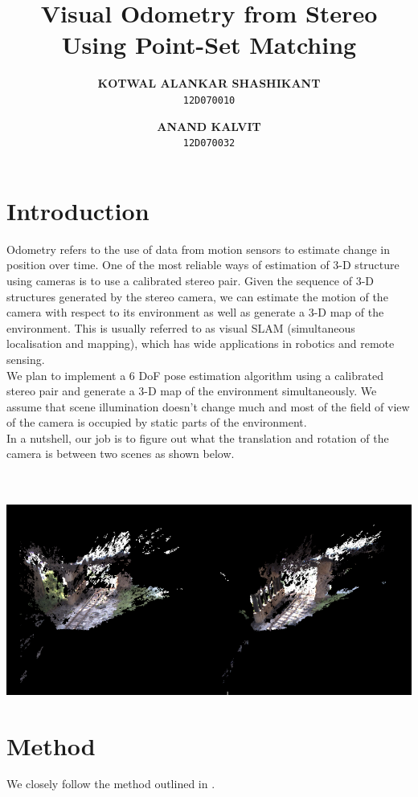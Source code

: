 \documentclass[11pt, a4paper]{article}
\author{
  \textbf{KOTWAL ALANKAR SHASHIKANT}\\
  \texttt{12D070010}
  \and
  \textbf{ANAND KALVIT}\\
  \texttt{12D070032}
}
\title{Visual Odometry from Stereo Using Point-Set Matching}
\begin{document}
\maketitle
\newpage

\section{Introduction}
Odometry refers to the use of data from motion sensors to estimate change in position over time. One of the most reliable ways of estimation of 3-D structure using cameras is to use a calibrated stereo pair. Given the sequence of 3-D structures generated by the stereo camera, we can estimate the motion of the camera with respect to its environment as well as generate a 3-D map of the environment. This is usually referred to as visual SLAM (simultaneous localisation and mapping), which has wide applications in robotics and remote sensing. \\

\noindent We plan to implement a 6 DoF pose estimation algorithm using a calibrated stereo pair and generate a 3-D map of the environment simultaneously. We assume that scene illumination doesn't change much and most of the field of view of the camera is occupied by static parts of the environment. \\

\noindent In a nutshell, our job is to figure out what the translation and rotation of the camera is between two scenes as shown below. \\ \\ \\
\centerline{\includegraphics[scale=0.50]{pointclouds}}
\newpage

\section{Method}
We closely follow the method outlined in \cite{main}. 
\end{document}
